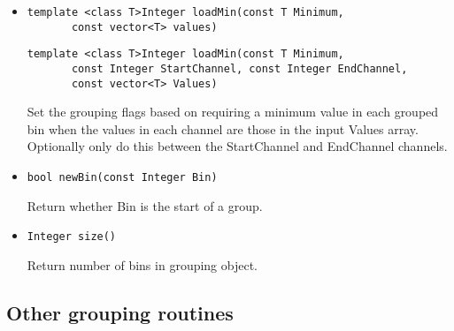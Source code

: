 \documentclass[11pt]{book}
\begin{document}
\begin{itemize}
\item  \begin{verbatim}template <class T>Integer loadMin(const T Minimum,
       const vector<T> values)\end{verbatim}
       \begin{verbatim}template <class T>Integer loadMin(const T Minimum,
       const Integer StartChannel, const Integer EndChannel, 
       const vector<T> Values)\end{verbatim}

          Set the grouping flags based on requiring a minimum value in
          each grouped bin when the values in each channel are those
          in the input Values array. Optionally only do this between
          the StartChannel and EndChannel channels.

\item  \begin{verbatim}bool newBin(const Integer Bin) \end{verbatim}

          Return whether Bin is the start of a group.

\item  \begin{verbatim}Integer size() \end{verbatim}

          Return number of bins in grouping object.

\end{itemize}

\subsection{Other grouping routines}
\end{document}

